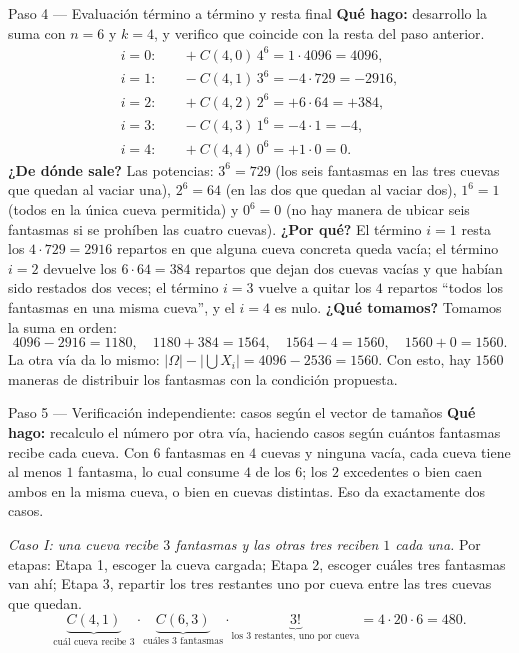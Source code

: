 \documentclass[11pt]{article}
\begin{document}
\begin{sol}
\begin{paso}{Paso 4 --- Evaluación término a término y resta final}
\textbf{Qué hago:} desarrollo la suma con $n=6$ y $k=4$, y verifico que coincide con la resta del paso anterior.
\[
\begin{aligned}
i=0:&\quad +C(4,0)\,4^6=1\cdot 4096=4096,\\
i=1:&\quad -C(4,1)\,3^6=-4\cdot 729=-2916,\\
i=2:&\quad +C(4,2)\,2^6=+6\cdot 64=+384,\\
i=3:&\quad -C(4,3)\,1^6=-4\cdot 1=-4,\\
i=4:&\quad +C(4,4)\,0^6=+1\cdot 0=0 .
\end{aligned}
\]
\textbf{¿De dónde sale?} Las potencias: $3^6=729$ (los seis fantasmas en las tres cuevas que quedan al vaciar una), $2^6=64$ (en las dos que quedan al vaciar dos), $1^6=1$ (todos en la única cueva permitida) y $0^6=0$ (no hay manera de ubicar seis fantasmas si se prohíben las cuatro cuevas).
\textbf{¿Por qué?} El término $i=1$ resta los $4\cdot 729=2916$ repartos en que alguna cueva concreta queda vacía; el término $i=2$ devuelve los $6\cdot 64=384$ repartos que dejan dos cuevas vacías y que habían sido restados dos veces; el término $i=3$ vuelve a quitar los $4$ repartos ``todos los fantasmas en una misma cueva'', y el $i=4$ es nulo.
\textbf{¿Qué tomamos?} Tomamos la suma en orden:
\[
4096-2916=1180,\quad 1180+384=1564,\quad 1564-4=1560,\quad 1560+0=1560 .
\]
La otra vía da lo mismo: $|\Omega|-\bigl|\bigcup X_i\bigr|=4096-2536=1560$. Con esto, hay $1560$ maneras de distribuir los fantasmas con la condición propuesta.
\end{paso}

\begin{paso}{Paso 5 --- Verificación independiente: casos según el vector de tamaños}
\textbf{Qué hago:} recalculo el número por otra vía, haciendo casos según cuántos fantasmas recibe cada cueva. Con $6$ fantasmas en $4$ cuevas y ninguna vacía, cada cueva tiene al menos $1$ fantasma, lo cual consume $4$ de los $6$; los $2$ excedentes o bien caen ambos en la misma cueva, o bien en cuevas distintas. Eso da exactamente dos casos.

\medskip
\emph{Caso I: una cueva recibe $3$ fantasmas y las otras tres reciben $1$ cada una.} Por etapas: Etapa 1, escoger la cueva cargada; Etapa 2, escoger cuáles tres fantasmas van ahí; Etapa 3, repartir los tres restantes uno por cueva entre las tres cuevas que quedan.
\[
\underbrace{C(4,1)}_{\text{cuál cueva recibe }3}\cdot\underbrace{C(6,3)}_{\text{cuáles 3 fantasmas}}\cdot\underbrace{3!}_{\text{los 3 restantes, uno por cueva}}
=4\cdot 20\cdot 6=480 .
\]


\end{paso}
\end{sol}
\end{document}
